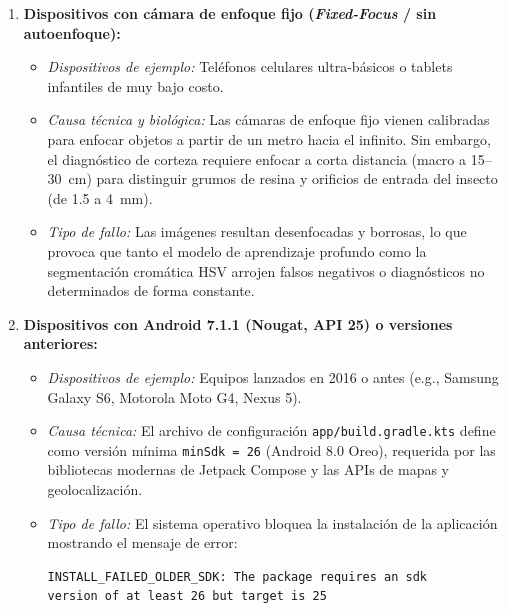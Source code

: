 \begin{enumerate}[label=\textbf{\arabic*.}]
    \item \textbf{Dispositivos con cámara de enfoque fijo (\textit{Fixed-Focus} / sin autoenfoque):}
    \begin{itemize}
        \item \textit{Dispositivos de ejemplo:} Teléfonos celulares ultra-básicos o tablets infantiles de muy bajo costo.
        \item \textit{Causa técnica y biológica:} Las cámaras de enfoque fijo vienen calibradas para enfocar objetos a partir de un metro hacia el infinito. Sin embargo, el diagnóstico de corteza requiere enfocar a corta distancia (macro a 15--30~cm) para distinguir grumos de resina y orificios de entrada del insecto (de 1.5 a 4~mm).
        \item \textit{Tipo de fallo:} Las imágenes resultan desenfocadas y borrosas, lo que provoca que tanto el modelo de aprendizaje profundo como la segmentación cromática HSV arrojen falsos negativos o diagnósticos no determinados de forma constante.
    \end{itemize}

    \item \textbf{Dispositivos con Android 7.1.1 (Nougat, API 25) o versiones anteriores:}
    \begin{itemize}
        \item \textit{Dispositivos de ejemplo:} Equipos lanzados en 2016 o antes (e.g., Samsung Galaxy S6, Motorola Moto G4, Nexus 5).
        \item \textit{Causa técnica:} El archivo de configuración \texttt{app/build.gradle.kts} define como versión mínima \texttt{minSdk = 26} (Android 8.0 Oreo), requerida por las bibliotecas modernas de Jetpack Compose y las APIs de mapas y geolocalización.
        \item \textit{Tipo de fallo:} El sistema operativo bloquea la instalación de la aplicación mostrando el mensaje de error:
\begin{verbatim}
INSTALL_FAILED_OLDER_SDK: The package requires an sdk
version of at least 26 but target is 25
\end{verbatim}
    \end{itemize}


\end{enumerate}
